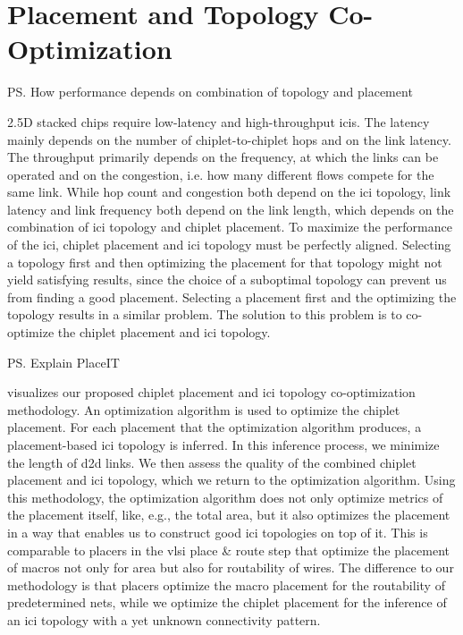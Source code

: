 \section{Placement and Topology Co-Optimization}
\label{sec:coopt}

\ps{How performance depends on combination of topology and placement}

2.5D stacked chips require low-latency and high-throughput \gls{ici}s.
The latency mainly depends on the number of chiplet-to-chiplet hops and on the link latency.
The throughput primarily depends on the frequency, at which the links can be operated and on the congestion, i.e. how many different flows compete for the same link.
While hop count and congestion both depend on the \gls{ici} topology, link latency and link frequency both depend on the link length, which depends on the combination of \gls{ici} topology and chiplet placement.
To maximize the performance of the \gls{ici}, chiplet placement and \gls{ici} topology must be perfectly aligned.
Selecting a topology first and then optimizing the placement for that topology might not yield satisfying results, since the choice of a suboptimal topology can prevent us from finding a good placement.
Selecting a placement first and the optimizing the topology results in a similar problem.
The solution to this problem is to co-optimize the chiplet placement and \gls{ici} topology.



\ps{Explain PlaceIT}

 visualizes our proposed chiplet placement and \gls{ici} topology co-optimization methodology.
An optimization algorithm is used to optimize the chiplet placement.
For each placement that the optimization algorithm produces, a placement-based \gls{ici} topology is inferred.
In this inference process, we minimize the length of \gls{d2d} links.
We then assess the quality of the combined chiplet placement and \gls{ici} topology, which we return to the optimization algorithm.
Using this methodology, the optimization algorithm does not only optimize metrics of the placement itself, like, e.g., the total area, but it also optimizes the placement in a way that enables us to construct good \gls{ici} topologies on top of it.
This is comparable to placers in the \gls{vlsi} place \& route step that optimize the placement of macros not only for area but also for routability of wires.
The difference to our methodology is that placers optimize the macro placement for the routability of predetermined nets, while we optimize the chiplet placement for the inference of an \gls{ici} topology with a yet unknown connectivity pattern.






